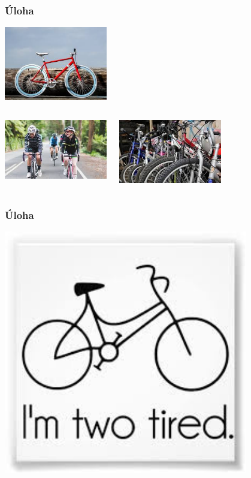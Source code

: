 \documentclass{beamer}
\begin{document}
\begin{frame}
\frametitle{Úloha}
      \centering
      \includegraphics[width=45mm]{bike.png}
      
      \vspace{1em}

  \begin{columns}[onlytextwidth,T]
      \column{50mm}
      \centering
      \includegraphics[width=45mm]{bike2.png}

      \column{50mm}
      \centering
      \includegraphics[width=45mm]{bike3.png}
        \end{columns}
\end{frame}

\begin{frame}
\frametitle{Úloha}
\centering
\includegraphics[width=0.8\textwidth]{bike4.png}
\end{frame}
\end{document}
